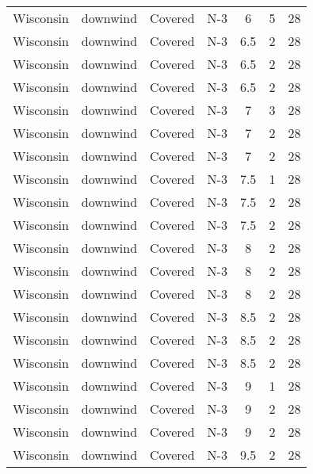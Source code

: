 \documentclass{article}
\begin{document}
\begin{longtable}[c]{ccccccc}
Wisconsin & downwind  & Covered     & N-3             & 6            & 5           & 28  \\
Wisconsin & downwind  & Covered     & N-3             & 6.5          & 2           & 28  \\
Wisconsin & downwind  & Covered     & N-3             & 6.5          & 2           & 28  \\
Wisconsin & downwind  & Covered     & N-3             & 6.5          & 2           & 28  \\
Wisconsin & downwind  & Covered     & N-3             & 7            & 3           & 28  \\
Wisconsin & downwind  & Covered     & N-3             & 7            & 2           & 28  \\
Wisconsin & downwind  & Covered     & N-3             & 7            & 2           & 28  \\
Wisconsin & downwind  & Covered     & N-3             & 7.5          & 1           & 28  \\
Wisconsin & downwind  & Covered     & N-3             & 7.5          & 2           & 28  \\
Wisconsin & downwind  & Covered     & N-3             & 7.5          & 2           & 28  \\
Wisconsin & downwind  & Covered     & N-3             & 8            & 2           & 28  \\
Wisconsin & downwind  & Covered     & N-3             & 8            & 2           & 28  \\
Wisconsin & downwind  & Covered     & N-3             & 8            & 2           & 28  \\
Wisconsin & downwind  & Covered     & N-3             & 8.5          & 2           & 28  \\
Wisconsin & downwind  & Covered     & N-3             & 8.5          & 2           & 28  \\
Wisconsin & downwind  & Covered     & N-3             & 8.5          & 2           & 28  \\
Wisconsin & downwind  & Covered     & N-3             & 9            & 1           & 28  \\
Wisconsin & downwind  & Covered     & N-3             & 9            & 2           & 28  \\
Wisconsin & downwind  & Covered     & N-3             & 9            & 2           & 28  \\
Wisconsin & downwind  & Covered     & N-3             & 9.5          & 2           & 28  \\

\end{longtable}
\end{document}

